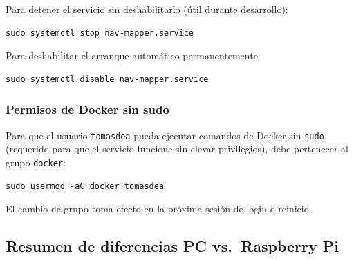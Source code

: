 Para detener el servicio sin deshabilitarlo (útil durante desarrollo):
\begin{verbatim}
sudo systemctl stop nav-mapper.service
\end{verbatim}

Para deshabilitar el arranque automático permanentemente:
\begin{verbatim}
sudo systemctl disable nav-mapper.service
\end{verbatim}

\subsubsection{Permisos de Docker sin sudo}

Para que el usuario \texttt{tomasdea} pueda ejecutar comandos de Docker
sin \texttt{sudo} (requerido para que el servicio funcione sin elevar
privilegios), debe pertenecer al grupo \texttt{docker}:

\begin{verbatim}
sudo usermod -aG docker tomasdea
\end{verbatim}

El cambio de grupo toma efecto en la próxima sesión de login o reinicio.

\subsection{Resumen de diferencias PC vs.\ Raspberry Pi}
\label{sec:docker-diff-summary}


